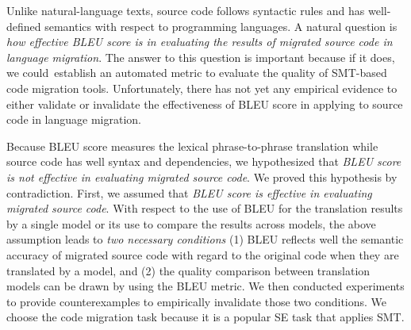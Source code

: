 Unlike natural-language texts, source code follows syntactic rules and
has well-defined semantics with respect to programming languages. A
natural question is {\em how effective BLEU score is in evaluating the
  results of migrated source code in language migration}. The answer
to this question is important because if it does, we could~establish
an automated metric to evaluate the quality of SMT-based code
migration tools. Unfortunately, there has not yet any empirical
evidence to either validate or invalidate the effectiveness of BLEU
score in applying to source code in language migration.

Because BLEU score measures the lexical phrase-to-phrase
translation while source code has well syntax and dependencies, we
hypothesized that {\em BLEU score is not effective in evaluating
  migrated source code}.
%
We proved this hypothesis by contradiction. First, we assumed that
{\em BLEU score is effective in evaluating migrated source code}.
%
With respect to the use of BLEU for the translation results by a
single model or its use to compare the results across models, the
above assumption leads to {\em two necessary conditions}
(1) BLEU reflects well the semantic accuracy of migrated source code
with regard to the original code when they are translated by a model,
and (2) the quality comparison between translation models can be drawn
by using the BLEU metric.
%
%
%
We then conducted experiments to provide counterexamples to
empirically invalidate those two conditions. We choose the code
migration task because it is a popular SE task that applies SMT.

